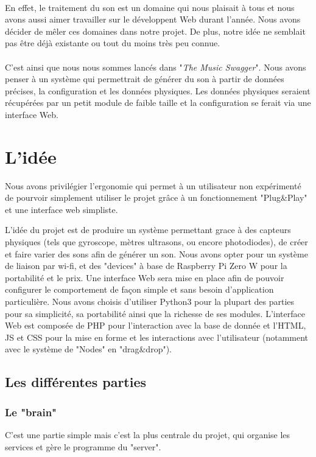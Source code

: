 \documentclass[12pt]{article}
\begin{document}
	\paragraph{}
	En effet, le traitement du son est un domaine qui nous plaisait à tous et nous avons aussi aimer travailler sur le développent Web durant l'année. Nous avons décider de mêler ces domaines dans notre projet. De plus, notre idée ne semblait pas être déjà existante ou tout du moins très peu connue.
	\paragraph{}
	C'est ainsi que nous nous sommes lancés dans "\textit{The Music Swagger}". Nous avons penser à un système qui permettrait de générer du son à partir de données précises, la configuration et les données physiques. Les données physiques seraient récupérées par un petit module de faible taille et la configuration se ferait via une interface Web. 
	
	\section{L'idée}
	Nous avons privilégier l'ergonomie qui permet à un utilisateur non expérimenté de pourvoir simplement utiliser le projet grâce à un fonctionnement "Plug\&Play" et une interface web simpliste.
	
	L'idée du projet est de produire un système permettant grace à des capteurs physiques (tels que gyroscope, mètres ultrasons, ou encore photodiodes), de créer et faire varier des sons afin de générer un son. Nous avons opter pour un système de liaison par wi-fi, et des "devices" à base de Raspberry Pi Zero W pour la portabilité et le prix. Une interface Web sera mise en place afin de pouvoir configurer le comportement de façon simple et sans besoin d'application particulière. Nous avons choisis d'utiliser Python3 pour la plupart des parties pour sa simplicité, sa portabilité ainsi que la richesse de ses modules. L'interface Web est composée de PHP pour l'interaction avec la base de donnée et l'HTML, JS et CSS pour la mise en forme et les interactions avec l'utilisateur (notamment avec le système de "Nodes" en "drag\&drop").
	\subsection{Les différentes parties}
	\subsubsection{Le "brain"}
	C'est une partie simple mais c'est la plus centrale du projet, qui organise les services et gère le programme du "server".
\end{document}
